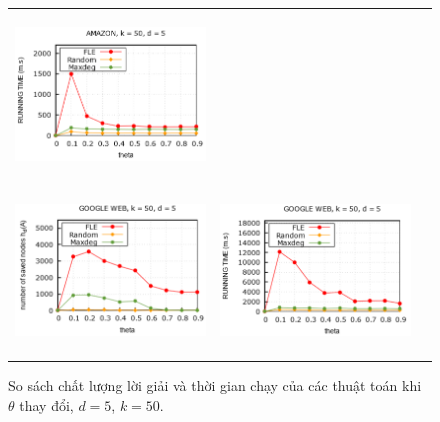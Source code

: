 \begin{figure}[H]
\begin{tabular}{lll}
		\includegraphics[height = 4.4cm]{picture/FLE/amazon_time_theta} 
		\\
		\includegraphics[height = 4.4cm]{picture/FLE/google_res_theta} &
		\includegraphics[height = 4.4cm]{picture/FLE/google_time_theta} 
	\end{tabular}
	\caption{So sách chất lượng lời giải và thời gian chạy của các thuật toán khi $\theta$ thay đổi, $d=5$, $k=50$.} 
	\label{fig:FLE_theta}   
\end{figure} 

